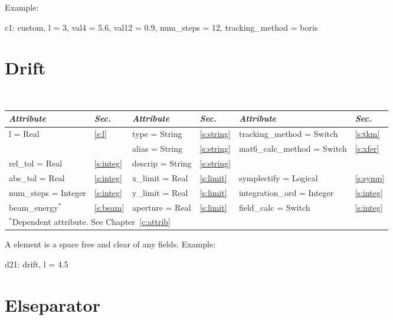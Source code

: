Example:
\begin{example}
  c1: custom, l = 3, val4 = 5.6, val12 = 0.9, num_steps = 12, tracking_method = boris
\end{example}

\section{Drift}
\label{s:drift}

\begin{center}
\tt
\begin{tabular}{|l|l||l|l||l|l|} \hline
  {\sl Attribute} & {\sl Sec.}  & {\sl Attribute} & {\sl Sec.} & {\sl Attribute} & {\sl Sec.} \\ \hline
  l        = Real       & \ref{s:l}     & type = String      & \ref{s:string} & tracking\_method = Switch    & \ref{s:tkm}   \\ \hline
                        &               & alias = String     & \ref{s:string} & mat6\_calc\_method = Switch  & \ref{s:xfer}  \\ \hline
  rel\_tol = Real       & \ref{s:integ} & descrip = String   & \ref{s:string} &                              &               \\ \hline
  abs\_tol = Real       & \ref{s:integ} & x\_limit = Real    & \ref{s:limit}  & symplectify = Logical        & \ref{s:symp}  \\ \hline
  num\_steps = Integer  & \ref{s:integ} & y\_limit = Real    & \ref{s:limit}  & integration\_ord = Integer   & \ref{s:integ} \\ \hline
  beam\_energy$^*$      & \ref{s:beam}  & aperture = Real    & \ref{s:limit}  & field\_calc = Switch         & \ref{s:integ} \\ \hline
  \multicolumn{6}{l}{\small $^*$Dependent attribute. See Chapter~\ref{c:attrib}} \\
\end{tabular}
\end{center}
\toffset

A  element is a space free and clear of any fields.
Example:
\begin{example}
  d21: drift, l = 4.5
\end{example}

\section{Elseparator}
\label{s:elsep}

